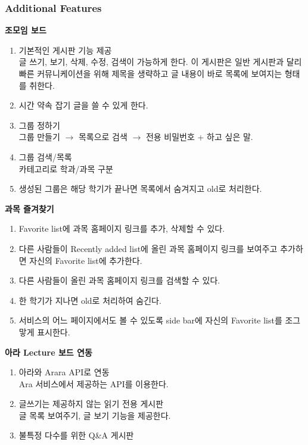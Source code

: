 \documentclass[a4paper,titlepage]{article}
\begin{document}
\subsubsection{Additional Features}
\begin{funcreq}
	\setcounter{enumi}{3}
	\item\textbf{조모임 보드}
	\begin{enumerate}
		\item 기본적인 게시판 기능 제공\\
		글 쓰기, 보기, 삭제, 수정, 검색이 가능하게 한다.
		이 게시판은 일반 게시판과 달리 빠른 커뮤니케이션을 위해 제목을 생략하고 글 내용이 바로 목록에 보여지는 형태를 취한다.
		\item 시간 약속 잡기 글을 쓸 수 있게 한다.
		\item 그룹 정하기\\
		그룹 만들기 $\rightarrow$ 목록으로 검색 $\rightarrow$ 전용 비밀번호 + 하고 싶은 말.
		\item 그룹 검색/목록\\
		카테고리로 학과/과목 구분
		\item 생성된 그룹은 해당 학기가 끝나면 목록에서 숨겨지고 old로 처리한다. 
	\end{enumerate}
	\item\textbf{과목 즐겨찾기}
	\begin{enumerate}
		\item Favorite list에 과목 홈페이지 링크를 추가, 삭제할 수 있다.
		\item 다른 사람들이 Recently added list에 올린 과목 홈페이지 링크를 보여주고 추가하면 자신의 Favorite list에 추가한다.
		\item 다른 사람들이 올린 과목 홈페이지 링크를 검색할 수 있다.
		\item 한 학기가 지나면 old로 처리하여 숨긴다.
		\item 서비스의 어느 페이지에서도 볼 수 있도록 side bar에 자신의 Favorite list를 조그맣게 표시한다.
	\end{enumerate}
	\item\textbf{아라 Lecture 보드 연동}
	\begin{enumerate}
		\item 아라와 Arara API로 연동\\
		Ara 서비스에서 제공하는 API를 이용한다. 
		\item 글쓰기는 제공하지 않는 읽기 전용 게시판\\
		글 목록 보여주기, 글 보기 기능을 제공한다. 
		\item 불특정 다수를 위한 Q\&A 게시판
	\end{enumerate}
\end{funcreq}
\end{document}
